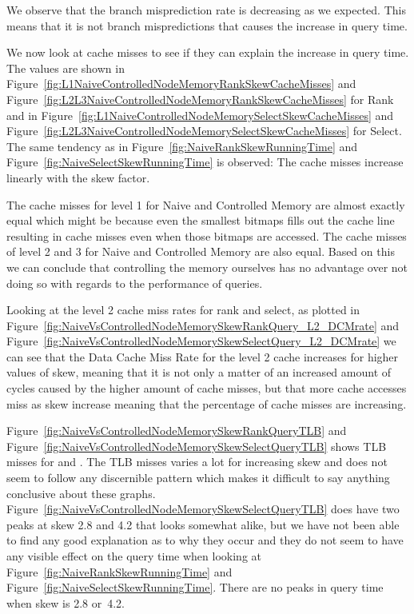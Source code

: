 We observe that the branch misprediction rate is decreasing as we expected. 
This means that it is not branch mispredictions that causes the increase in query time. 

We now look at cache misses to see if they can explain the increase in query time. 
The values are shown in Figure~\ref{fig:L1NaiveControlledNodeMemoryRankSkewCacheMisses} and Figure~\ref{fig:L2L3NaiveControlledNodeMemoryRankSkewCacheMisses} for Rank and in Figure~\ref{fig:L1NaiveControlledNodeMemorySelectSkewCacheMisses} and Figure~\ref{fig:L2L3NaiveControlledNodeMemorySelectSkewCacheMisses} for Select.
The same tendency as in Figure~\ref{fig:NaiveRankSkewRunningTime} and Figure~\ref{fig:NaiveSelectSkewRunningTime} is observed: 
The cache misses increase linearly with the skew factor.

The cache misses for level 1 for Naive and Controlled Memory are almost exactly equal which might be because even the smallest bitmaps fills out the cache line resulting in cache misses even when those bitmaps are accessed. 
The cache misses of level 2 and 3 for Naive and Controlled Memory are also equal. 
Based on this we can conclude that controlling the memory ourselves has no advantage over not doing so with regards to the performance of queries.

Looking at the level 2 cache miss rates for rank and select, as plotted in Figure~\ref{fig:NaiveVsControlledNodeMemorySkewRankQuery_L2_DCMrate} and Figure~\ref{fig:NaiveVsControlledNodeMemorySkewSelectQuery_L2_DCMrate} we can see that the Data Cache Miss Rate for the level 2 cache increases for higher values of skew, meaning that it is not only a matter of an increased amount of cycles caused by the higher amount of cache misses, but that more cache accesses miss as skew increase meaning that the percentage of cache misses are increasing.

Figure~\ref{fig:NaiveVsControlledNodeMemorySkewRankQueryTLB} and Figure~\ref{fig:NaiveVsControlledNodeMemorySkewSelectQueryTLB} shows TLB misses for  and . 
The TLB misses varies a lot for increasing skew and does not seem to follow any discernible pattern which makes it difficult to say anything conclusive about these graphs. 
Figure~\ref{fig:NaiveVsControlledNodeMemorySkewSelectQueryTLB} does have two peaks at skew 2.8 and 4.2 that looks somewhat alike, but we have not been able to find any good explanation as to why they occur and they do not seem to have any visible effect on the query time when looking at Figure~\ref{fig:NaiveRankSkewRunningTime} and Figure~\ref{fig:NaiveSelectSkewRunningTime}.
There are no peaks in query time when skew is 2.8 or~4.2.

